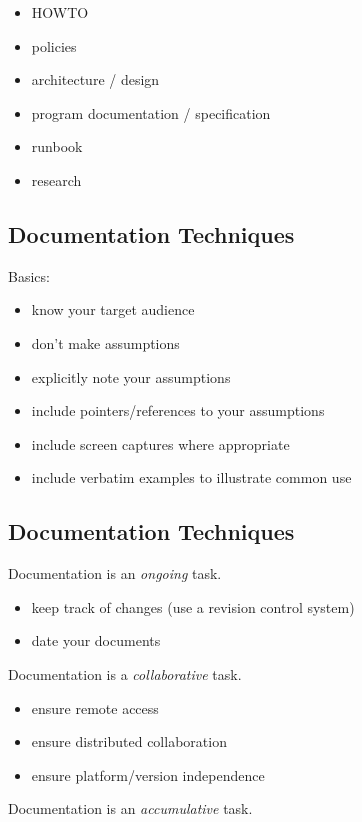 \documentclass[xga]{xdvislides}
\begin{document}
\begin{itemize}
	\item HOWTO
	\item policies
	\item architecture / design
	\item program documentation / specification
	\item runbook
	\item research
\end{itemize}


\subsection{Documentation Techniques}
Basics:
\begin{itemize}
	\item know your target audience
	\item don't make assumptions
	\item explicitly note your assumptions
	\item include pointers/references to your assumptions
	\item include screen captures where appropriate
	\item include verbatim examples to illustrate common use
\end{itemize}

\subsection{Documentation Techniques}
Documentation is an {\em ongoing} task.

\begin{itemize}
	\item keep track of changes (use a revision control system)
	\item date your documents
\end{itemize}

\vspace{.25in}
Documentation is a {\em collaborative} task.

\begin{itemize}
	\item ensure remote access
	\item ensure distributed collaboration
	\item ensure platform/version independence
\end{itemize}

\vspace{.25in}
Documentation is an {\em accumulative} task.
\end{document}
